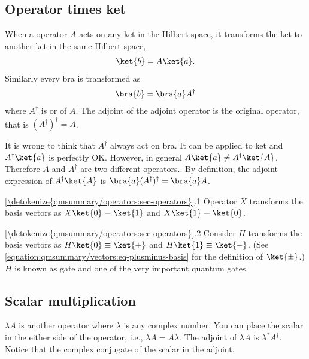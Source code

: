 \documentclass[letterpaper,10pt,english]{jupyterBook}
\begin{document}
\subsection{Operator times ket}
\label{\detokenize{qmsummary/operators:operator-times-ket}}\label{\detokenize{qmsummary/operators:pp-times-ket}}
\sphinxAtStartPar
When a operator \(A\) acts on any ket in the Hilbert space, it transforms the ket to another ket in the same Hilbert space,
\begin{equation*}
\begin{split}
\ket{b} = A \ket{a}.
\end{split}
\end{equation*}
\sphinxAtStartPar
Similarly every bra is transformed as
\begin{equation*}
\begin{split}
\bra{b} = \bra{a} A^\dagger
\end{split}
\end{equation*}
\sphinxAtStartPar
where \(A^\dagger\) is  or  of \(A\).  The adjoint of the adjoint operator is the original operator, that is  \((A^\dagger)^\dagger = A\).

\sphinxAtStartPar
It is wrong to think that \(A^\dagger\) always act on bra.  It can be applied to ket and \(A^\dagger \ket{a}\) is perfectly OK.  However, in general \(A \ket{a} \ne A^\dagger \ket{A}\). Therefore \(A\) and \(A^\dagger\) are two different operators..  By definition, the adjoint expression of \(A^\dagger \ket{A}\) is \(\bra{a} (A^\dagger)^\dagger = \bra{a} A\).

\sphinxAtStartPar
{} \hyperref[\detokenize{qmsummary/operators:sec-operators}]{\ref{\detokenize{qmsummary/operators:sec-operators}}}.1  Operator \(X\) transforms the basis vectors as \(X\ket{0} \equiv \ket{1}\) and \(X\ket{1} \equiv \ket{0}\).

\sphinxAtStartPar
{} \hyperref[\detokenize{qmsummary/operators:sec-operators}]{\ref{\detokenize{qmsummary/operators:sec-operators}}}.2  Consider \(H\) transforms the basis vectors as \(H\ket{0} \equiv \ket{+}\) and \(H\ket{1} \equiv \ket{-}\).
(See \eqref{equation:qmsummary/vectors:eq-plusminus-basis} for the definition of \(\ket{\pm}\).)  \(H\) is known as  gate and one of the very important quantum gates.


\subsection{Scalar multiplication}
\label{\detokenize{qmsummary/operators:scalar-multiplication}}
\sphinxAtStartPar
\(\lambda A\) is another operator where \(\lambda\) is any complex number.  You can place the scalar in the either side of the operator, i.e., \(\lambda A = A \lambda\). The adjoint of \(\lambda A\) is \(\lambda^* A^\dagger\).  Notice that the complex conjugate of the scalar in the adjoint.
\end{document}

